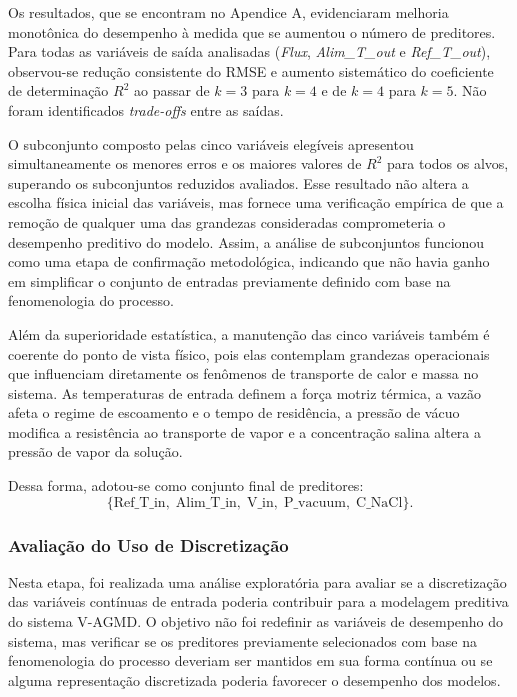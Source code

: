 Os resultados, que se encontram no Apendice A, evidenciaram melhoria monotônica do desempenho à medida que se aumentou o número de preditores. Para todas as variáveis de saída analisadas (\textit{Flux}, \textit{Alim\_T\_out} e \textit{Ref\_T\_out}), observou-se redução consistente do RMSE e aumento sistemático do coeficiente de determinação $R^2$ ao passar de $k=3$ para $k=4$ e de $k=4$ para $k=5$. Não foram identificados \textit{trade-offs} entre as saídas.

O subconjunto composto pelas cinco variáveis elegíveis apresentou simultaneamente os menores erros e os maiores valores de \(R^2\) para todos os alvos, superando os subconjuntos reduzidos avaliados. Esse resultado não altera a escolha física inicial das variáveis, mas fornece uma verificação empírica de que a remoção de qualquer uma das grandezas consideradas comprometeria o desempenho preditivo do modelo. Assim, a análise de subconjuntos funcionou como uma etapa de confirmação metodológica, indicando que não havia ganho em simplificar o conjunto de entradas previamente definido com base na fenomenologia do processo.

Além da superioridade estatística, a manutenção das cinco variáveis também é coerente do ponto de vista físico, pois elas contemplam grandezas operacionais que influenciam diretamente os fenômenos de transporte de calor e massa no sistema. As temperaturas de entrada definem a força motriz térmica, a vazão afeta o regime de escoamento e o tempo de residência, a pressão de vácuo modifica a resistência ao transporte de vapor e a concentração salina altera a pressão de vapor da solução.

Dessa forma, adotou-se como conjunto final de preditores:
\[
\{\text{Ref\_T\_in},\; \text{Alim\_T\_in},\; \text{V\_in},\; \text{P\_vacuum},\; \text{C\_NaCl}\}.
\]


\subsubsection{Avaliação do Uso de Discretização}

Nesta etapa, foi realizada uma análise exploratória para avaliar se a discretização das variáveis contínuas de entrada poderia contribuir para a modelagem preditiva do sistema V-AGMD. O objetivo não foi redefinir as variáveis de desempenho do sistema, mas verificar se os preditores previamente selecionados com base na fenomenologia do processo deveriam ser mantidos em sua forma contínua ou se alguma representação discretizada poderia favorecer o desempenho dos modelos.

